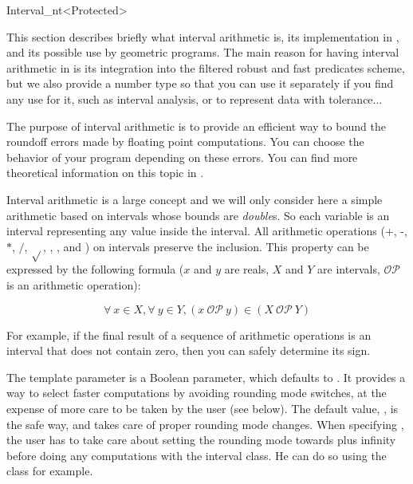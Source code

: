
\begin{ccRefClass}{Interval_nt<Protected>}
\label{interval}


\ccDefinition

This section describes briefly what interval arithmetic is, its implementation
in {\cgal}, and its possible use by geometric programs.
The main reason for having interval arithmetic in {\cgal} is its integration
into the filtered robust and fast predicates scheme, but we also provide a
number type so that you can use it separately if you find any use for it,
such as interval analysis, or to represent data with tolerance...

The purpose of interval arithmetic is to provide an efficient way to bound
the roundoff errors made by floating point computations.
You can choose the behavior of your program depending on these errors. 
You can find more theoretical information on this topic in
\cite{cgal:bbp-iayed-01}.

Interval arithmetic is a large concept and we will only consider here a 
simple arithmetic based on intervals whose bounds are {\it double}s.
So each variable is an interval representing any value inside the interval.
All arithmetic operations (+, -, $*$, $/$, $\sqrt{}$, ,
,  and ) on intervals preserve the inclusion.
This property can be expressed by the following formula ($x$ and $y$ are
reals, $X$ and $Y$ are intervals, $\mathcal{OP}$ is an arithmetic operation):

$$
\forall\ x \in X, \forall\ y \in Y, (x\ \mathcal{OP}\ y)
\in (X\ \mathcal{OP}\ Y)
$$

For example, if the final result of a sequence of arithmetic operations is
an interval that does not contain zero, then you can safely determine its sign.


\ccParameters

The template parameter  is a Boolean parameter, which defaults
to .  It provides a way to select faster computations by avoiding
rounding mode switches, at the expense of more care to be taken by the user
(see below).  The default value, , is the safe way, and takes care of
proper rounding mode changes.  When specifying , the user has to
take care about setting the rounding mode towards plus infinity before
doing any computations with the interval class.  He can do so using the
 class for example.


\end{ccRefClass}
